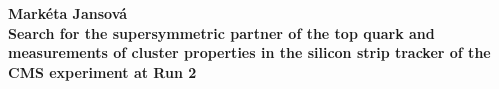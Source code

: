 
%



\newpage
\thispagestyle{empty}



\vspace*{-0.5cm}
\begin{center}
    \textbf{\Large{Mark\'{e}ta Jansov\'{a}}}\\
\vspace*{0.2cm}
    \textbf{\Large{Search for the supersymmetric partner of the top quark and measurements of cluster properties in the silicon strip tracker of the CMS experiment at Run 2\vspace*{0.3cm}}}
\end{center}

